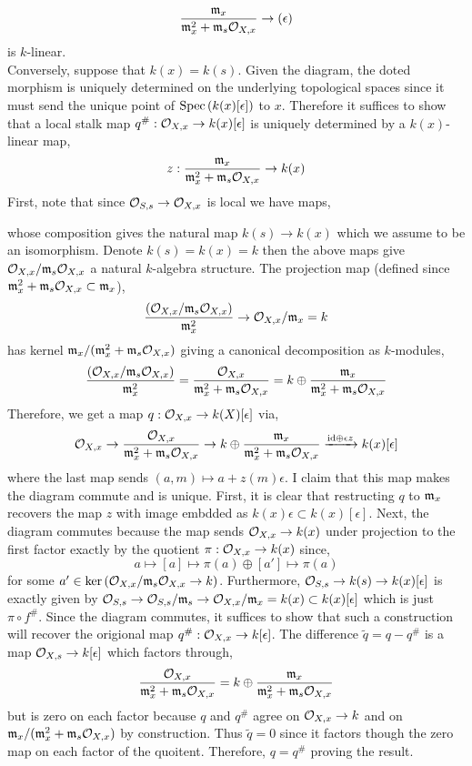 \documentclass[12pt]{article}
\begin{document}
\[ \frac{\mathfrak{m}_x}{\mathfrak{m}_x^2 + \mathfrak{m}_s \mathcal{O}_{X, x}}  \to (\epsilon) \]
is $k$-linear.
\bigskip\\
Conversely, suppose that $k(x) = k(s)$. Given the diagram, the doted morphism is uniquely determined on the underlying topological spaces since it must send the unique point of $\mathrm{Spec}\left( k(x)[\epsilon] \right)$ to $x$. Therefore it suffices to show that a local stalk map $q^\# : \mathcal{O}_{X, x} \to k(x)[\epsilon]$ is uniquely determined by a $k(x)$-linear map,
\[ z : \frac{\mathfrak{m}_x}{\mathfrak{m}_x^2 + \mathfrak{m}_s \mathcal{O}_{X, x}} \to k(x) \]
First, note that since $\mathcal{O}_{S, s} \to \mathcal{O}_{X, x}$ is local we have maps,
\begin{center}
\end{center}
whose composition gives the natural map $k(s) \to k(x)$ which we assume to be an isomorphism. Denote $k(s) = k(x) = k$ then the above maps give $\mathcal{O}_{X, x} / \mathfrak{m}_s \mathcal{O}_{X, x}$ a natural $k$-algebra structure. The projection map (defined since $\mathfrak{m}_x^2 + \mathfrak{m}_s \mathcal{O}_{X, x} \subset \mathfrak{m}_x$),
\[ \frac{(\mathcal{O}_{X, x} / \mathfrak{m}_s \mathcal{O}_{X, x})}{\mathfrak{m}_x^2} \to \mathcal{O}_{X, x} / \mathfrak{m}_x = k \]
has kernel $\mathfrak{m}_x /(\mathfrak{m}_x^2 + \mathfrak{m}_s \mathcal{O}_{X, x})$ giving a canonical decomposition as $k$-modules,
\[ \frac{(\mathcal{O}_{X, x} / \mathfrak{m}_s \mathcal{O}_{X, x})}{\mathfrak{m}_x^2} = \frac{\mathcal{O}_{X, x}}{\mathfrak{m}_x^2 + \mathfrak{m}_s \mathcal{O}_{X, x}} = k \oplus \frac{\mathfrak{m}_x}{\mathfrak{m}_x^2 + \mathfrak{m}_s \mathcal{O}_{X, x}} \]
Therefore, we get a map $q : \mathcal{O}_{X, x} \to k(X)[\epsilon]$ via,
\[ \mathcal{O}_{X, x} \to \frac{\mathcal{O}_{X, x}}{\mathfrak{m}_x^2 + \mathfrak{m}_s \mathcal{O}_{X, x}} \to k \oplus \frac{\mathfrak{m}_x}{\mathfrak{m}_x^2 + \mathfrak{m}_s \mathcal{O}_{X, x}} \xrightarrow{\mathrm{id} \oplus \epsilon z} k(x)[\epsilon] \]
where the last map sends $(a, m) \mapsto a + z(m) \epsilon$. I claim that this map makes the diagram commute and is unique. First, it is clear that restructing $q$ to $\mathfrak{m}_x$ recovers the map $z$ with image embdded as $k(x) \epsilon \subset k(x)[\epsilon]$. Next, the diagram commutes because the map sends $\mathcal{O}_{X, x} \to k(x)$ under projection to the first factor exactly by the quotient $\pi : \mathcal{O}_{X, x} \to k(x)$ since,
\[ a \mapsto [a] \mapsto \pi(a) \oplus [a'] \mapsto \pi(a) \]
for some $a' \in \ker{(\mathcal{O}_{X, x} / \mathfrak{m}_s \mathcal{O}_{X, x} \to k)}$. Furthermore, $\mathcal{O}_{S, s} \to k(s) \to k(x)[\epsilon]$ is exactly given by $\mathcal{O}_{S, s} \to \mathcal{O}_{S, s} / \mathfrak{m}_s \to \mathcal{O}_{X, x} / \mathfrak{m}_x = k(x) \subset k(x)[\epsilon]$ which is just $\pi \circ f^\#$. Since the diagram commutes, it suffices to show that such a construction will recover the origional map $q^\# : \mathcal{O}_{X, x} \to k[\epsilon]$. The difference $\tilde{q} = q - q^\#$ is a map $\mathcal{O}_{X, s} \to k[\epsilon]$ which factors through,
\[ \frac{\mathcal{O}_{X, x}}{\mathfrak{m}_x^2 + \mathfrak{m}_s \mathcal{O}_{X, x}} = k \oplus \frac{\mathfrak{m}_x}{\mathfrak{m}_x^2 + \mathfrak{m}_s \mathcal{O}_{X, x}} \]
but is zero on each factor because $q$ and $q^\#$ agree on $\mathcal{O}_{X, x} \to k$ and on $\mathfrak{m}_x / (\mathfrak{m}_x^2 + \mathfrak{m}_s \mathcal{O}_{X, x})$ by construction. Thus $\tilde{q} = 0$ since it factors though the zero map on each factor of the quoitent. Therefore, $q = q^\#$ proving the result. 
\end{document}
